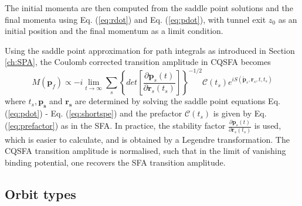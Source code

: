\documentclass[11pt]{article}
\numberwithin{equation}{section}
\begin{document}
\newline
The initial momenta are then computed from the saddle point solutions and the final momenta using Eq. (\ref{eq:rdot}) and Eq. (\ref{eq:pdot}), with tunnel exit $z_0$ as an initial position and the final momentum as a limit condition. 
\par
Using the saddle point approximation for path integrals as introduced in Section \ref{ch:SPA}, the Coulomb corrected transition amplitude in CQSFA becomes
\begin{equation} \label{eq:MCQSFA}
     M(\textbf{p}_f) \propto -i \lim_{t\rightarrow\infty} \sum_s \left \{ det\left [ \frac{\partial\textbf{p}_s(t)}{\partial\textbf{r}_s(t_s)} \right ] \right \}^{-1/2} \mathcal{C}(t_s) e^{i S(\tilde{\textbf{p}}_s,\textbf{r}_s,t,t_s)}
\end{equation}
where $t_s, \mathbf{p_s}$ and $\mathbf{r_s}$ are determined by solving the saddle point equations Eq. (\ref{eq:pdot}) - Eq. (\ref{eq:shortspe}) and the prefactor $\mathcal{C}(t_s)$ is given by Eq. (\ref{eq:prefactor}) as in the SFA. In practice, the stability factor $\frac{\partial\textbf{p}_s(t)}{\partial\textbf{r}_s(t_s)} $ is used, which is easier to calculate, and is obtained by a Legendre transformation. The CQSFA transition amplitude is normalised, such that in the limit of vanishing binding potential, one recovers the SFA transition amplitude.

\subsection{Orbit types} \label{ch:orbits}
\end{document}
